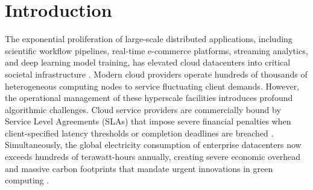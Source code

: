 \documentclass[default,sn-mathphys-num]{sn-jnl}
\theoremstyle{thmstyleone}
\theoremstyle{thmstyletwo}
\theoremstyle{thmstylethree}
\begin{document}

\maketitle

\section{Introduction}\label{sec:intro}

The exponential proliferation of large-scale distributed applications, including scientific workflow pipelines, real-time e-commerce platforms, streaming analytics, and deep learning model training, has elevated cloud datacenters into critical societal infrastructure \cite{armbrust2010view, buyya2009cloud}. Modern cloud providers operate hundreds of thousands of heterogeneous computing nodes to service fluctuating client demands. However, the operational management of these hyperscale facilities introduces profound algorithmic challenges. Cloud service providers are commercially bound by Service Level Agreements (SLAs) that impose severe financial penalties when client-specified latency thresholds or completion deadlines are breached \cite{garg2013energy, dehury2021survey}. Simultaneously, the global electricity consumption of enterprise datacenters now exceeds hundreds of terawatt-hours annually, creating severe economic overhead and massive carbon footprints that mandate urgent innovations in green computing \cite{beloglazov2012energy, kumar2020energy}.
\end{document}
